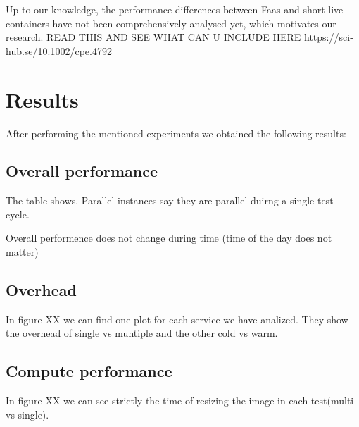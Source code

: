 \documentclass[11pt]{article}
\begin{document}
Up to our knowledge, the performance differences between Faas and short live containers have not been comprehensively analysed yet, which motivates our research.
READ THIS AND SEE WHAT CAN U INCLUDE HERE
\url{https://sci-hub.se/10.1002/cpe.4792}


\section{Results}
After performing the mentioned experiments we obtained the following results:



\subsection{Overall performance}

The table shows. Parallel instances say they are parallel duirng a single test cycle.


Overall performence does not change during time (time of the day does not matter)

\subsection{Overhead}

In figure XX we can find one plot for each service we have analized. They show the overhead of single vs muntiple and the other cold vs warm.




\subsection{Compute performance}

In figure XX we can see strictly the time of resizing the image in each test(multi vs single).
\end{document}
